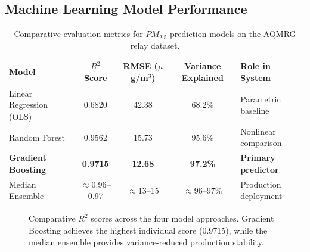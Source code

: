 \documentclass[12pt,a4paper]{article}
\begin{document}
\subsection{Machine Learning Model Performance}

\begin{table}[H]
\centering
\caption{Comparative evaluation metrics for $PM_{2.5}$ prediction models on the AQMRG relay dataset.}
\label{tab:results}
\begin{tabular}{@{}lcccl@{}}
\toprule
\textbf{Model} & \textbf{$R^2$ Score} & \textbf{RMSE ($\mu$g/m$^3$)} & \textbf{Variance Explained} & \textbf{Role in System} \\
\midrule
Linear Regression (OLS) & 0.6820 & 42.38 & 68.2\% & Parametric baseline \\
Random Forest & 0.9562 & 15.73 & 95.6\% & Nonlinear comparison \\
\textbf{Gradient Boosting} & \textbf{0.9715} & \textbf{12.68} & \textbf{97.2\%} & \textbf{Primary predictor} \\
Median Ensemble & $\approx$0.96--0.97 & $\approx$13--15 & $\approx$96--97\% & Production deployment \\
\bottomrule
\end{tabular}
\end{table}

\begin{figure}[H]
\centering
{}
\caption{Comparative $R^2$ scores across the four model approaches. Gradient Boosting achieves the highest individual score (0.9715), while the median ensemble provides variance-reduced production stability.}
\label{fig:r2_comparison}
\end{figure}
\end{document}
